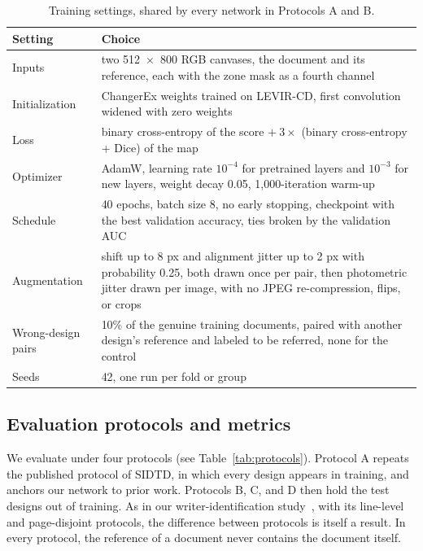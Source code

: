 \documentclass[12pt,a4paper]{article}
\begin{document}
\begin{table}[htbp]
\centering\small
\caption{Training settings, shared by every network in Protocols A and B.}
\label{tab:train}
\begin{tabular}{lL{11.4cm}}
\toprule
Setting & Choice \\
\midrule
Inputs & two 512~$\times$~800 RGB canvases, the document and its reference, each with the zone mask as a fourth channel \\
Initialization & ChangerEx weights trained on LEVIR-CD, first convolution widened with zero weights \\
Loss & binary cross-entropy of the score $+\ 3\times$ (binary cross-entropy $+$ Dice) of the map \\
Optimizer & AdamW, learning rate $10^{-4}$ for pretrained layers and $10^{-3}$ for new layers, weight decay 0.05, 1,000-iteration warm-up \\
Schedule & 40 epochs, batch size 8, no early stopping, checkpoint with the best validation accuracy, ties broken by the validation AUC \\
Augmentation & shift up to 8 px and alignment jitter up to 2 px with probability 0.25, both drawn once per pair, then photometric jitter drawn per image, with no JPEG re-compression, flips, or crops \\
Wrong-design pairs & 10\% of the genuine training documents, paired with another design's reference and labeled to be referred, none for the control \\
Seeds & 42, one run per fold or group \\
\bottomrule
\end{tabular}
\end{table}

\subsection{Evaluation protocols and metrics}
\label{sec:protocols}
We evaluate under four protocols (see Table~\ref{tab:protocols}). Protocol A repeats the published protocol of SIDTD, in which every design appears in training, and anchors our network to prior work. Protocols B, C, and D then hold the test designs out of training. As in our writer-identification study~\cite{abushahla2026ijdar}, with its line-level and page-disjoint protocols, the difference between protocols is itself a result. In every protocol, the reference of a document never contains the document itself.
\end{document}
